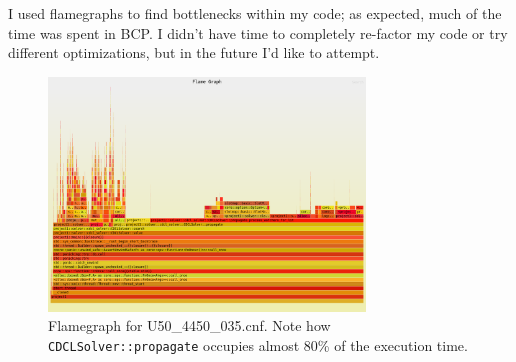 \documentclass[11pt]{article}
\begin{document}
I used flamegraphs to find bottlenecks within my code; as expected, much of the time was spent in
BCP. I didn't have time to completely re-factor my code or try different optimizations, but in the
future I'd like to attempt.

\begin{figure}[htpb]
    \centering
    \includegraphics[width=0.75\textwidth]{U50_4450_035.png}
    \caption{Flamegraph for U50\_4450\_035.cnf. Note how \texttt{CDCLSolver::propagate} occupies
    almost 80\% of the execution time.}
    \label{fig:fg}
\end{figure}

\pagebreak



\end{document}

